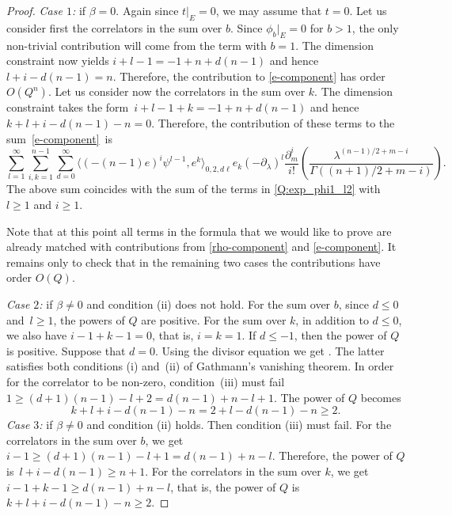 \documentclass[pdftex]{sigma}
\numberwithin{equation}{section}
\begin{document}
\begin{proof}
{\em Case $1$:} if $\beta=0$. Again since $t|_E=0$, we may assume that $t=0$. Let us consider first the correlators in the sum over $b$. Since $\phi_b|_{E}=0$ for $b>1$, the only non-trivial contribution will come from the term with $b=1$. The dimension constraint now yields
$i+l-1 = -1 + n + d(n-1)$ and hence $l+i-d(n-1)=n$. Therefore, the contribution to \eqref{e-component} has order $O(Q^n)$. Let us consider now the correlators in the sum over $k$. The dimension constraint takes the form~$i+l-1+k=-1+n+d(n-1)$ and hence $k+l+i-d(n-1)-n=0$. Therefore, the contribution of these terms to the sum~\eqref{e-component}~is
\[
\sum_{l=1}^\infty
\sum_{i,k=1}^{n-1}
\sum_{d=0}^\infty
\big\langle (-(n-1)e)^i \psi^{l-1}, e^k
\big\rangle_{0,2,d\ell} e_k
(-\partial_\lambda)^l
\frac{\partial_m^i}{i!}\left(
\frac{\lambda^{(n-1)/2+m-i}}{
\Gamma((n+1)/2+m-i)}
\right).
\]
The above sum coincides with the sum of the terms in \eqref{Q:exp_phi1_l2} with $l\geq 1$ and $i\geq 1$.

Note that at this point all terms in the formula that we would like to prove are already matched with contributions from \eqref{rho-component} and \eqref{e-component}. It remains only to check that in the remaining two cases the contributions have order $O(Q)$.

{\em Case $2$:} if $\beta\neq 0$ and condition (ii) does not hold. For the sum over $b$, since $d\leq 0$ and~$l\geq 1$, the powers of $Q$ are positive. For the sum over $k$, in addition to $d\leq 0$, we also have ${i-1+k-1=0}$, that is, $i=k=1$. If $d\leq -1$, then the power of $Q$ is positive. Suppose that $d=0$. Using the divisor equation we get . The latter satisfies both conditions (i) and~(ii) of Gathmann's vanishing theorem. In order for the correlator to be non-zero, condition~(iii) must fail $1\geq (d+1)(n-1)-l+2=d(n-1)+n-l+1$. The power of $Q$ becomes
\[
k+l+i-d(n-1)-n = 2+l-d(n-1)-n \geq 2.
\]
{\em Case $3$:} if $\beta\neq 0$ and condition (ii) holds. Then condition (iii) must fail. For the correlators in the sum over $b$, we get
$i-1\geq (d+1)(n-1)-l+1 =d(n-1) + n-l$.
Therefore, the power of $Q$ is~$l+i-d(n-1)\geq n+1$. For the correlators in the sum over $k$, we get
$i-1+k-1\geq d(n-1) + n-l$, that is, the power of $Q$ is $k+l+i-d(n-1)-n\geq 2$.
\end{proof}
\end{document}
